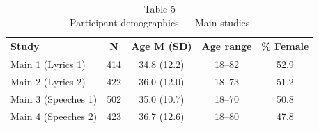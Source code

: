 \begin{table}[t]
\caption*{
{\large Table 5} \\ 
{\small Participant demographics — Main studies}
} 
\fontsize{12.0pt}{14.4pt}\selectfont
\begin{tabular*}{\linewidth}{@{\extracolsep{\fill}}lcccc}
\toprule
Study & N & Age M (SD) & Age range & \% Female \\ 
\midrule\addlinespace[2.5pt]
Main 1 (Lyrics 1) & 414 & 34.8 (12.2) & 18–82 & 52.9 \\ 
Main 2 (Lyrics 2) & 422 & 36.0 (12.0) & 18–73 & 51.2 \\ 
Main 3 (Speeches 1) & 502 & 35.0 (10.7) & 18–70 & 50.8 \\ 
Main 4 (Speeches 2) & 423 & 36.7 (12.6) & 18–80 & 47.8 \\ 
\bottomrule
\end{tabular*}
\end{table}

